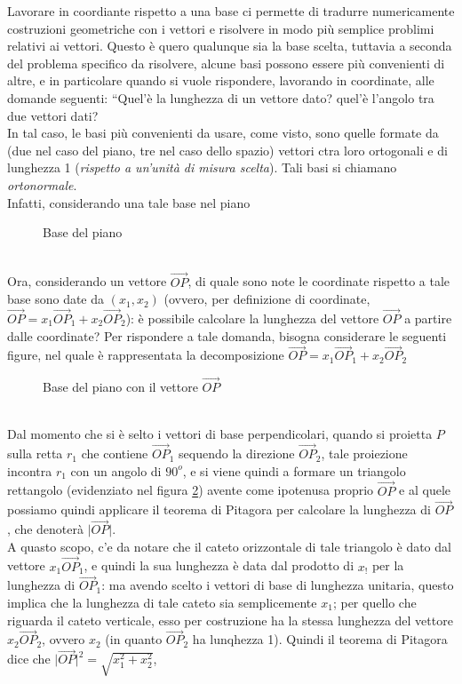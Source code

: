 \documentclass{book}
\newcommand{\abs}[1]{\lvert#1\rvert}
\theoremstyle{definition}
\theoremstyle{plain}
\begin{document}
Lavorare in coordiante rispetto a una base ci permette di tradurre numericamente costruzioni geometriche con i vettori e risolvere in modo più semplice problimi relativi ai vettori. Questo è quero qualunque sia la base scelta, tuttavia a seconda del problema specifico da risolvere, alcune basi possono essere più convenienti di altre, e in particolare quando si vuole rispondere, lavorando in coordinate, alle domande seguenti: ``Quel'è la lunghezza di un vettore dato? quel'è l'angolo tra due vettori dati?\\
In tal caso, le basi più convenienti da usare, come visto, sono quelle formate da (due nel caso del piano, tre nel caso dello spazio) vettori ctra loro ortogonali e di lunghezza 1 (\textit{rispetto a un'unità di misura scelta}). Tali basi si chiamano \textit{ortonormale}.\\
Infatti, considerando una tale base nel piano
\begin{figure}[ht!]
  \centering
  \resizebox{3cm}{!}{
      
    }
  \caption{Base del piano}
  \label{fig:basedelpiano}
\end{figure}\\
Ora, considerando un vettore $\vec{OP}$, di quale sono note le coordinate rispetto a tale base sono date da $(x_1,x_2)$ (ovvero, per definizione di coordinate, $\vec{OP}=x_1\vec{OP}_1+x_2\vec{OP}_2$): è possibile calcolare la lunghezza del vettore $\vec{OP}$ a partire dalle coordinate? Per rispondere a tale domanda, bisogna considerare le seguenti figure, nel quale è rappresentata la decomposizione $\vec{OP}=x_1\vec{OP}_1+x_2\vec{OP}_2$
\begin{figure}[ht!]
  \centering
  \resizebox{4cm}{!}{
      
    }
  \caption{Base del piano con il vettore $\vec{OP}$}
  \label{fig:basedelpianoConVettOP}
\end{figure}\\
Dal momento che si è selto i vettori di base perpendicolari, quando si proietta $P$ sulla retta $r_1$ che contiene $\vec{OP}_1$ sequendo la direzione $\vec{OP}_2$, tale proiezione incontra $r_1$ con un angolo di $90^o$, e si viene quindi a formare un triangolo rettangolo (evidenziato nel figura \ref{fig:basedelpianoConVettOP}) avente come ipotenusa proprio $\vec{OP}$ e al quele possiamo quindi applicare il teorema di Pitagora per calcolare la lunghezza di $\vec{OP}$, che denoterà $\abs{\vec{OP}}$. \\
A quasto scopo, c'e da notare che il cateto orizzontale di tale triangolo è dato dal vettore $x_1\vec{OP}_1$, e quindi la sua lunghezza è data dal prodotto di $x_!$ per la lunghezza di $\vec{OP}_1$: ma avendo scelto i vettori di base di lunghezza unitaria, questo implica che la lunghezza di tale cateto sia semplicemente $x_1$; per quello che riguarda il cateto verticale, esso per costruzione ha la stessa lunghezza del vettore $x_2\vec{OP}_2$, ovvero $x_2$ (in quanto $\vec{OP}_2$ ha lunqhezza 1). Quindi il teorema di Pitagora dice che $\abs{\vec{OP}}^2=\sqrt{x_1^2+x_2^2}$,
\end{document}
